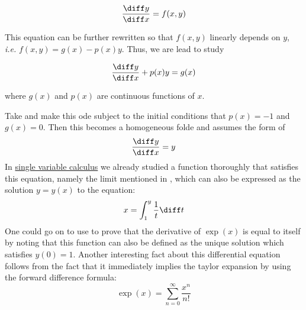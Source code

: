 \begin{equation}\label{eq-folde-simple2}
	\frac{\diff y}{\diff x} = f(x, y)
\end{equation}

\begin{flushleft}
	This equation can be further rewritten so that $f(x,y)$ linearly depends on
	$y$, \emph{i.e.} $f(x,y) = g(x) - p(x)y$. Thus, we are lead to study
\end{flushleft}

\begin{equation}\label{eq-folde-simple3}
	\frac{\diff y}{\diff x} + p(x)y = g(x)
\end{equation}

\begin{flushleft}
	where $g(x)$ and $p(x)$ are continuous functions of $x$.
\end{flushleft}

\begin{exm}\label{exm-diff-eq-euler}
	Take  and make this \gls{ode} subject to
	the initial conditions that $p(x)=-1$ and $g(x)=0$. Then this becomes a
	homogeneous \gls{folde} and assumes the form of
	\begin{equation}\label{eq-diff-eq-euler}
		\frac{\diff y}{\diff x} = y
	\end{equation}
	In \hyperref[sec-single-var-calc]{single variable calculus} we already
	studied a function thoroughly that satisfies this equation, namely
	the limit mentioned in , which can also
	be expressed as the solution $y=y(x)$ to the equation:
	\begin{equation*}
		x = \int_1^y \frac{1}{t} \diff t
	\end{equation*}
	One could go on to use  to prove that the
	derivative of $\exp(x)$ is equal to itself by noting that this function can
	also be defined as the unique solution which satisfies $y(0)=1$. Another
	interesting fact about this differential equation follows from the fact
	that it immediately implies the taylor expansion by using the forward difference
	formula:
	\begin{equation*}
		\exp(x) = \sum_{n=0}^\infty \frac{x^n}{n!}
	\end{equation*}
\end{exm}
